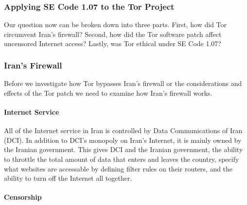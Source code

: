 \documentclass[11pt]{article}
\begin{document}
\begin{multicols}{2}
\subsubsection{Applying SE Code 1.07 to the Tor Project}

\newline

Our question now can be broken down into three parts. First, how did Tor
circumvent Iran's firewall? Second, how did the Tor software patch affect
uncensored Internet access?  Lastly, was Tor ethical under SE Code 1.07?

\subsubsection{Iran's Firewall}
Before we investigate how Tor bypasses Iran's firewall or the considerations and
effects of the Tor patch we need to examine how Iran's firewall works.

\paragraph{Internet Service}

All of the Internet service in Iran is controlled by Data Communications of Iran
(DCI). \cite{FindingWayAroundIranianCensorship} In addition to DCI's monopoly on
Iran's Internet, it is mainly owned by the Iranian government.
\cite{FindingWayAroundIranianCensorship, DCI:Articles} This gives DCI and the
Iranian government, the ability to throttle the total amount of data that enters
and leaves the country, specify what websites are accessable by defining filter
rules on their routers, and the ability to turn off the Internet all together.
\cite{FindingWayAroundIranianCensorship}

\paragraph{Censorship} 


\end{multicols}
\end{document}
